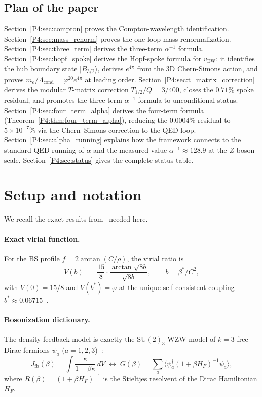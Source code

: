 \documentclass[11pt,a4paper]{article}
\theoremstyle{definition}
\theoremstyle{remark}
\newcommand{\vp}{\varphi}
\newcommand{\bst}{\beta^{*}}
\newcommand{\vEW}{v_{\mathrm{EW}}}
\newcommand{\aInv}{\alpha^{-1}}
\newcommand{\Lcond}{\Lambda_{\mathrm{cond}}}
\begin{document}
\subsection{Plan of the paper}

Section~\ref{P4:sec:compton} proves the Compton-wavelength identification.
Section~\ref{P4:sec:mass_renorm} proves the one-loop mass renormalization.
Section~\ref{P4:sec:three_term} derives the three-term $\aInv$ formula.
Section~\ref{P4:sec:hopf_spoke} derives the Hopf-spoke formula for $\vEW$:
it identifies the hub boundary state $|B_{3/2}\rangle$, derives $e^{4\pi}$
from the 3D Chern-Simons action, and proves $m_e/\Lcond = \vp^{20}e^{4\pi}$
at leading order.
Section~\ref{P4:sec:t_matrix_correction} derives the modular $T$-matrix
correction $T_{1/2}/Q = 3/400$, closes the $0.71\%$ spoke residual,
and promotes the three-term $\aInv$ formula to unconditional status.
Section~\ref{P4:sec:four_term_alpha} derives the four-term formula
(Theorem~\ref{P4:thm:four_term_alpha}), reducing the $0.0004\%$ residual
to $5\times10^{-7}\%$ via the Chern--Simons correction to the QED loop.
Section~\ref{P4:sec:alpha_running} explains how the framework connects to
the standard QED running of $\alpha$ and the measured value $\aInv\approx128.9$
at the $Z$-boson scale.
Section~\ref{P4:sec:status} gives the complete status table.

\section{Setup and notation}
\label{P4:sec:setup}

We recall the exact results from~\cite{Paper1,Paper2,Paper3} needed here.

\paragraph{Exact virial function.}
For the BS profile $f = 2\arctan(C/\rho)$, the virial ratio is
\begin{equation}
  V(b) \;=\; \frac{15}{8}\cdot\frac{\arctan\sqrt{8b}}{\sqrt{8b}},
  \qquad b = \bst/C^2,
  \label{P4:eq:virial}
\end{equation}
with $V(0) = 15/8$ and $V(b^*) = \vp$ at the unique self-consistent
coupling $b^* \approx 0.06715$~\cite{Paper3}.

\paragraph{Bosonization dictionary.}
The density-feedback model is exactly the $\mathrm{SU}(2)_3$ WZW model
of $k=3$ free Dirac fermions $\psi_a$ ($a=1,2,3$)~\cite{Witten1984,Paper3}:
\[
  J_{\mathrm{fb}}(\beta)
  = \int\frac{\kappa}{1+\beta\kappa}\,dV
  \;\longleftrightarrow\;
  G(\beta) = \sum_a\langle\psi_a^\dagger(1+\beta H_F)^{-1}\psi_a\rangle,
\]
where $R(\beta) = (1+\beta H_F)^{-1}$ is the Stieltjes resolvent of
the Dirac Hamiltonian $H_F$.
\end{document}
